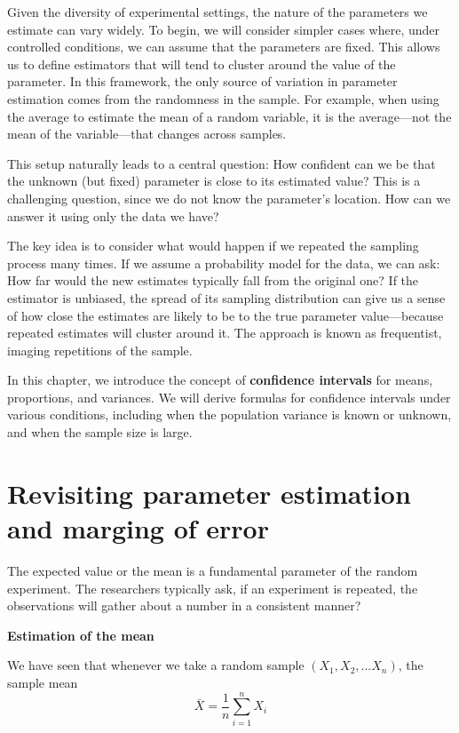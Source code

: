 \documentclass[
]{book}
\begin{document}
Given the diversity of experimental settings, the nature of the parameters we estimate can vary widely. To begin, we will consider simpler cases where, under controlled conditions, we can assume that the parameters are fixed. This allows us to define estimators that will tend to cluster around the value of the parameter. In this framework, the only source of variation in parameter estimation comes from the randomness in the sample. For example, when using the average to estimate the mean of a random variable, it is the average---not the mean of the variable---that changes across samples.

This setup naturally leads to a central question: How confident can we be that the unknown (but fixed) parameter is close to its estimated value? This is a challenging question, since we do not know the parameter's location. How can we answer it using only the data we have?

The key idea is to consider what would happen if we repeated the sampling process many times. If we assume a probability model for the data, we can ask: How far would the new estimates typically fall from the original one? If the estimator is unbiased, the spread of its sampling distribution can give us a sense of how close the estimates are likely to be to the true parameter value---because repeated estimates will cluster around it. The approach is known as frequentist, imaging repetitions of the sample.

In this chapter, we introduce the concept of \textbf{confidence intervals} for means, proportions, and variances. We will derive formulas for confidence intervals under various conditions, including when the population variance is known or unknown, and when the sample size is large.

\hypertarget{revisiting-parameter-estimation-and-marging-of-error}{%
\section{Revisiting parameter estimation and marging of error}\label{revisiting-parameter-estimation-and-marging-of-error}}

The expected value or the mean is a fundamental parameter of the random experiment. The researchers typically ask, if an experiment is repeated, the observations will gather about a number in a consistent manner?

\textbf{Estimation of the mean}

We have seen that whenever we take a random sample \((X_1, X_2, ... X_n)\), the sample mean
\[\bar{X}=\frac{1}{n}\sum_{i=1}^n X_i\]
\end{document}
